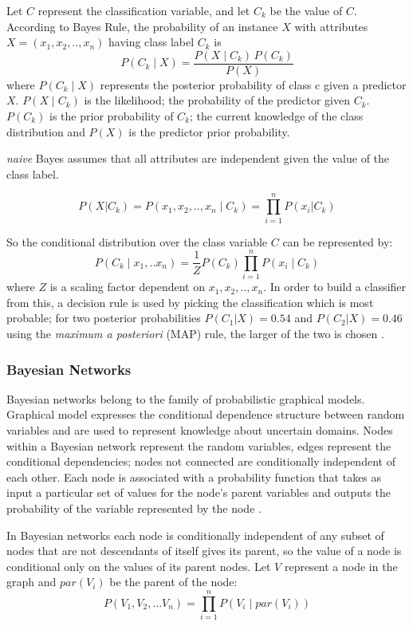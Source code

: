 \documentclass{cmppgr}
\begin{document}
Let $C$ represent the classification variable, and let $C_k$ be the value of $C$.
According to Bayes Rule, the probability of an instance $X$ with attributes $X = (x_1, x_2,.. , x_n)$
having class label $C_k$ is
$$ P(C_k \mid X) = \frac{P(X \mid C_k) \, P(C_k)}{P(X)} $$
where $P(C_k \mid X)$ represents the posterior probability of class c given a predictor $X$. $P(X\mid C_k)$ is the likelihood; the probability of the predictor given $C_k$. $P(C_k)$ is the prior probability of $C_k$; the current knowledge of the class distribution and $P(X)$ is the predictor prior probability.

\textit{naive} Bayes assumes that all attributes are independent given the value of the class label.

$$P(X|C_k)=P(x_1, x_2,.. , x_n \mid C_k) = \prod_{i=1}^{n}P(x_i|C_k) $$

So the conditional distribution over the class variable $C$ can be represented by:
$$P(C_k \mid x_1,.. x_n) = \frac{1}{Z}P(C_k)\prod_{i=1}^{n}P(x_i \mid C_k)$$
where $Z$ is a scaling factor dependent on $x_1, x_2,.. , x_n $. In order to build a classifier from this, a decision rule is used by picking the classification which is most probable; for two posterior probabilities $P(C_1|X)= 0.54$ and $P(C_2|X) =0.46$ using the \textit{maximum a posteriori} (MAP) rule, the larger of the two is chosen \cite{zhang2004optimality}.


\subsubsection{Bayesian Networks}
Bayesian networks belong to the family of probabilistic graphical models. Graphical model expresses the conditional dependence structure between random variables and are used to represent knowledge about uncertain domains. Nodes within a Bayesian network represent the random variables, edges represent the conditional dependencies; nodes not connected are conditionally independent of each other. Each node is associated with a probability function that takes as input a particular set of values for the node's parent variables and outputs the probability of the variable represented by the node \cite{heckerman1995learning}.

In Bayesian networks each node is conditionally independent of any subset of nodes that are not descendants of itself gives its parent, so the value of a node is conditional only on the values of its parent nodes. Let $V$ represent a node in the graph and $par(V_i)$ be the parent of the node:
$$P(V_1, V_2, \dots V_n) = \prod_{i=1}^{n}P(V_i \mid par(V_i))$$
\end{document}
